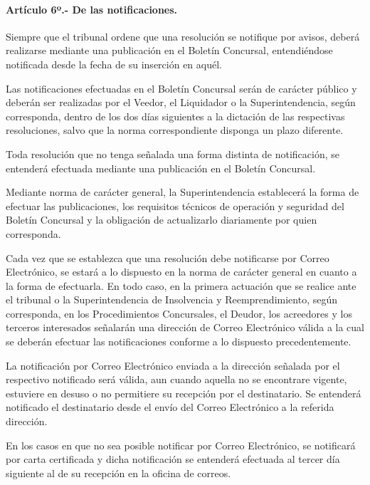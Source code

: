 \documentclass[
]{book}
\begin{document}
\hypertarget{artuxedculo-6uxba.--de-las-notificaciones.}{%
\paragraph*{Artículo 6º.- De las notificaciones.}\label{artuxedculo-6uxba.--de-las-notificaciones.}}

Siempre que el tribunal ordene que una resolución se notifique por avisos, deberá realizarse mediante una publicación en el Boletín Concursal, entendiéndose notificada desde la fecha de su inserción en aquél.

Las notificaciones efectuadas en el Boletín Concursal serán de carácter público y deberán ser realizadas por el Veedor, el Liquidador o la Superintendencia, según corresponda, dentro de los dos días siguientes a la dictación de las respectivas resoluciones, salvo que la norma correspondiente disponga un plazo diferente.

Toda resolución que no tenga señalada una forma distinta de notificación, se entenderá efectuada mediante una publicación en el Boletín Concursal.

Mediante norma de carácter general, la Superintendencia establecerá la forma de efectuar las publicaciones, los requisitos técnicos de operación y seguridad del Boletín Concursal y la obligación de actualizarlo diariamente por quien corresponda.

Cada vez que se establezca que una resolución debe notificarse por Correo Electrónico, se estará a lo dispuesto en la norma de carácter general en cuanto a la forma de efectuarla. En todo caso, en la primera actuación que se realice ante el tribunal o la Superintendencia de Insolvencia y Reemprendimiento, según corresponda, en los Procedimientos Concursales, el Deudor, los acreedores y los terceros interesados señalarán una dirección de Correo Electrónico válida a la cual se deberán efectuar las notificaciones conforme a lo dispuesto precedentemente.

La notificación por Correo Electrónico enviada a la dirección señalada por el respectivo notificado será válida, aun cuando aquella no se encontrare vigente, estuviere en desuso o no permitiere su recepción por el destinatario. Se entenderá notificado el destinatario desde el envío del Correo Electrónico a la referida dirección.

En los casos en que no sea posible notificar por Correo Electrónico, se notificará por carta certificada y dicha notificación se entenderá efectuada al tercer día siguiente al de su recepción en la oficina de correos.
\end{document}
